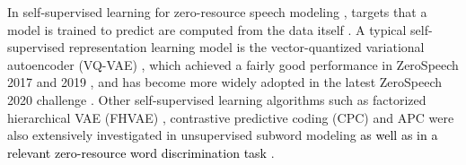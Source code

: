 \documentclass[transmag]{IEEEtran}
\begin{document}
In self-supervised learning for zero-resource speech modeling \cite{oord2017neural,hsu2017nips,oord2018cpc,Pascual2019,Chung2019,badino2014auto}, targets that a model is trained to predict are computed from the data itself \cite{doersch2017multi}. A typical self-supervised representation learning model is the vector-quantized variational autoencoder (VQ-VAE) \cite{oord2017neural}, which 
achieved a fairly good performance in ZeroSpeech 2017 \cite{chorowski2019unsupervised} and 2019 \cite{Tjandra2019}, and has become more widely adopted  \cite{Niekerk2020,Tobing2020Cyclic,Tjandra2020transformer} in the latest ZeroSpeech 2020 challenge \cite{Dunbar2020zero}.
Other self-supervised learning algorithms such as factorized hierarchical VAE  (FHVAE) \cite{Hsu2018extracting}, contrastive predictive coding (CPC) \cite{oord2018cpc} and APC \cite{Chung2019} were also extensively investigated in unsupervised subword modeling \cite{Feng2019improving,riviere2020unsupervised,feng2020unsupervised,Niekerk2020} \textcolor{black}{ as well as in a relevant zero-resource word discrimination task \cite{vanStaden2021comparison}}.

\end{document}
